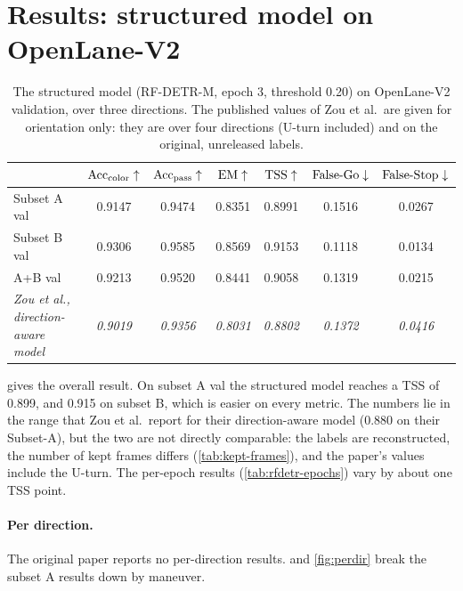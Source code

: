 \section{Results: structured model on OpenLane-V2}
\label{sec:res-openlane}

\begin{table}[t]
\centering
\caption{The structured model (RF-DETR-M, epoch 3, threshold 0.20) on OpenLane-V2 validation, over three
directions. The published values of Zou et al.\ are given for orientation only: they are over four
directions (U-turn included) and on the original, unreleased labels.}
\label{tab:openlane}
\small\setlength{\tabcolsep}{4pt}
\begin{tabular}{@{}lcccccc@{}}
\toprule
 & $\mathrm{Acc}_{\mathrm{color}}\uparrow$ & $\mathrm{Acc}_{\mathrm{pass}}\uparrow$ & $\mathrm{EM}\uparrow$ & $\mathrm{TSS}\uparrow$ & $\mathrm{False\text{-}Go}\downarrow$ & $\mathrm{False\text{-}Stop}\downarrow$ \\
\midrule
Subset A val & 0.9147 & 0.9474 & 0.8351 & 0.8991 & 0.1516 & 0.0267 \\
Subset B val & 0.9306 & 0.9585 & 0.8569 & 0.9153 & 0.1118 & 0.0134 \\
A+B val & 0.9213 & 0.9520 & 0.8441 & 0.9058 & 0.1319 & 0.0215 \\
\midrule
\emph{Zou et al., direction-aware model} & \emph{0.9019} & \emph{0.9356} & \emph{0.8031} & \emph{0.8802} & \emph{0.1372} & \emph{0.0416} \\
\bottomrule
\end{tabular}
\end{table}

 gives the overall result. On subset A val the structured model reaches a TSS of
0.899, and 0.915 on subset B, which is easier on every metric. The numbers lie in the range that Zou et
al.\ report for their direction-aware model (0.880 on their Subset-A), but the two are not directly
comparable: the labels are reconstructed, the number of kept frames differs (\cref{tab:kept-frames}),
and the paper's values include the U-turn. The per-epoch results (\cref{tab:rfdetr-epochs}) vary by about
one TSS point.

\paragraph{Per direction.} The original paper reports no per-direction results.  and
\cref{fig:perdir} break the subset A results down by maneuver.

